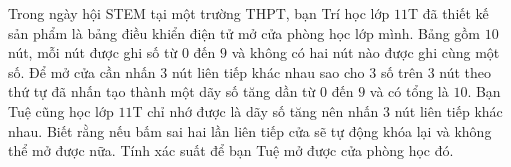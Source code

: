 \begin{bt}%
	Trong ngày hội STEM tại một trường THPT, bạn Trí học lớp $11$T đã thiết kế sản phẩm là bảng điều khiển điện tử mở cửa phòng học lớp mình. Bảng gồm $10$ nút, mỗi nút được ghi số từ $0$ đến $9$ và không có hai nút nào được ghi cùng một số. Để mở cửa cần nhấn $3$ nút liên tiếp khác nhau sao cho $3$ số trên $3$ nút theo thứ tự đã nhấn tạo thành một dãy số tăng dần từ $0$ đến $9$ và có tổng là $10$. Bạn Tuệ cũng học lớp $11$T chỉ nhớ được là dãy số tăng nên nhấn $3$ nút liên tiếp khác nhau. Biết rằng nếu bấm sai hai lần liên tiếp cửa sẽ tự động khóa lại và không thể mở được nữa. Tính xác suất để bạn Tuệ mở được cửa phòng học đó.
\end{bt}


